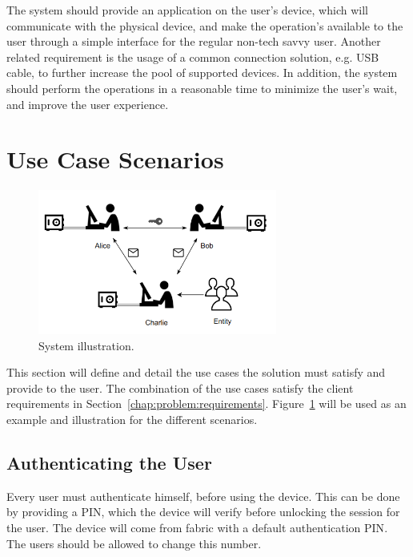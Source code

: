 The system should provide an application on the user's device, which will communicate with the physical device, and make the operation's available to the user through a simple interface for the regular non-tech savvy user.
Another related requirement is the usage of a common connection solution, e.g. USB cable, to further increase the pool of supported devices.
In addition, the system should perform the operations in a reasonable time to minimize the user's wait, and improve the user experience.

\section{Use Case Scenarios}\label{chap:problem:scenarios}

\begin{figure}[h]
    \centering
    \includegraphics[width=0.7\textwidth]{./Images/main-figure.png}
    \caption{System illustration.}
    \label{fig:main-system}
\end{figure}

This section will define and detail the use cases the solution must satisfy and provide to the user. The combination of the use cases satisfy the client requirements in Section~\ref{chap:problem:requirements}.
Figure~\ref{fig:main-system} will be used as an example and illustration for the different scenarios.

\subsection{Authenticating the User}\label{chap:problem:scenarios:auth}

Every user must authenticate himself, before using the device. This can be done by providing a \ac{PIN}, which the device will verify before unlocking the session for the user.
The device will come from fabric with a default authentication \ac{PIN}. The users should be allowed to change this number.

